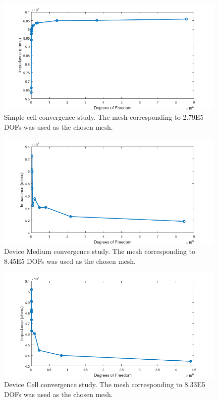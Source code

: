 \begin{figure}[h]
    \centering
    \includegraphics[width=\textwidth]{images/simpleCellConvergence.png}
    \caption[Simple cell convergence study]{Simple cell convergence study. The mesh corresponding to 2.79E5 DOFs was used as the chosen mesh.}
    \label{fig:simple_cell_convergence}
\end{figure}
\begin{figure}[h]
    \centering
    \includegraphics[width=\textwidth]{images/device_medium_convergence.png}
    \caption[Device medium convergence study]{Device Medium convergence study. The mesh corresponding to 8.45E5 DOFs was used as the chosen mesh.}
    \label{fig:device_medium_convergence}
\end{figure}
\begin{figure}[h]
    \centering
    \includegraphics[width=\textwidth]{images/device_cell_convergence.png}
    \caption[Device cell convergence study]{Device Cell convergence study. The mesh corresponding to 8.33E5 DOFs was used as the chosen mesh.}
    \label{fig:device_cell_convergence}
\end{figure}



